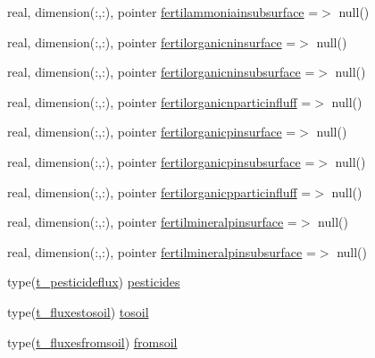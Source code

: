 \begin{DoxyCompactItemize}
\item 
real, dimension(\+:,\+:), pointer \mbox{\hyperlink{structmodulevegetation_1_1t__fluxes_ab561beea68185c1569fdbfb3f043a2f2}{fertilammoniainsubsurface}} =$>$ null()
\item 
real, dimension(\+:,\+:), pointer \mbox{\hyperlink{structmodulevegetation_1_1t__fluxes_a11b1301c425f569d2d72492735fa2408}{fertilorganicninsurface}} =$>$ null()
\item 
real, dimension(\+:,\+:), pointer \mbox{\hyperlink{structmodulevegetation_1_1t__fluxes_a52a41432acf785646eecc0e85a316c89}{fertilorganicninsubsurface}} =$>$ null()
\item 
real, dimension(\+:,\+:), pointer \mbox{\hyperlink{structmodulevegetation_1_1t__fluxes_af9b7e70591e54ae84b5141c1d02722df}{fertilorganicnparticinfluff}} =$>$ null()
\item 
real, dimension(\+:,\+:), pointer \mbox{\hyperlink{structmodulevegetation_1_1t__fluxes_a699948e23960c57ff26a56865bd35cfe}{fertilorganicpinsurface}} =$>$ null()
\item 
real, dimension(\+:,\+:), pointer \mbox{\hyperlink{structmodulevegetation_1_1t__fluxes_a6f4bdf3d02333afff5aa5f78578940c5}{fertilorganicpinsubsurface}} =$>$ null()
\item 
real, dimension(\+:,\+:), pointer \mbox{\hyperlink{structmodulevegetation_1_1t__fluxes_a8e6b65c8f888199feed4cd379978c5f2}{fertilorganicpparticinfluff}} =$>$ null()
\item 
real, dimension(\+:,\+:), pointer \mbox{\hyperlink{structmodulevegetation_1_1t__fluxes_ae668664b00dd89de9893c0818a49a52d}{fertilmineralpinsurface}} =$>$ null()
\item 
real, dimension(\+:,\+:), pointer \mbox{\hyperlink{structmodulevegetation_1_1t__fluxes_a72d45370f1a99d84ce281e0aa338938c}{fertilmineralpinsubsurface}} =$>$ null()
\item 
type(\mbox{\hyperlink{structmodulevegetation_1_1t__pesticideflux}{t\+\_\+pesticideflux}}) \mbox{\hyperlink{structmodulevegetation_1_1t__fluxes_a751bfdae666292c6ed1dee331e902417}{pesticides}}
\item 
type(\mbox{\hyperlink{structmodulevegetation_1_1t__fluxestosoil}{t\+\_\+fluxestosoil}}) \mbox{\hyperlink{structmodulevegetation_1_1t__fluxes_aa30a2bd30e3a1b88abb8405cebdd7cba}{tosoil}}
\item 
type(\mbox{\hyperlink{structmodulevegetation_1_1t__fluxesfromsoil}{t\+\_\+fluxesfromsoil}}) \mbox{\hyperlink{structmodulevegetation_1_1t__fluxes_a56b5164b6f030e47d281387fa230b559}{fromsoil}}
\end{DoxyCompactItemize}


